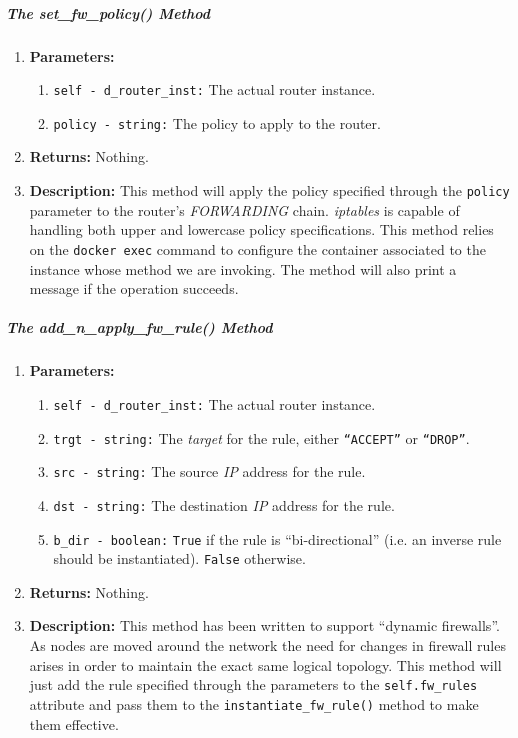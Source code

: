         \subparagraph{The set\_fw\_policy() Method}
            \begin{enumerate}
                \item \textbf{Parameters:}
                \begin{enumerate}
                    \item \texttt{self - d\_router\_inst:} The actual router instance.
                    \item \texttt{policy - string:} The policy to apply to the router.
                \end{enumerate}
                \item \textbf{Returns:} Nothing.
                \item \textbf{Description:} This method will apply the policy specified through the \texttt{policy} parameter to the router's \textit{FORWARDING} chain. \textit{iptables} is capable of handling both upper and lowercase policy specifications. This method relies on the \texttt{docker exec} command to configure the container associated to the instance whose method we are invoking. The method will also print a message if the operation succeeds.
            \end{enumerate}

        \subparagraph{The add\_n\_apply\_fw\_rule() Method}
            \begin{enumerate}
                \item \textbf{Parameters:}
                \begin{enumerate}
                    \item \texttt{self - d\_router\_inst:} The actual router instance.
                    \item \texttt{trgt - string:} The \textit{target} for the rule, either \texttt{``ACCEPT''} or \texttt{``DROP''}.
                    \item \texttt{src - string:} The source \textit{IP} address for the rule.
                    \item \texttt{dst - string:} The destination \textit{IP} address for the rule.
                    \item \texttt{b\_dir - boolean:} \texttt{True} if the rule is ``bi-directional'' (i.e. an inverse rule should be instantiated). \texttt{False} otherwise.
                \end{enumerate}
                \item \textbf{Returns:} Nothing.
                \item \textbf{Description:} This method has been written to support ``dynamic firewalls''. As nodes are moved around the network the need for changes in firewall rules arises in order to maintain the exact same logical topology. This method will just add the rule specified through the parameters to the \texttt{self.fw\_rules} attribute and pass them to the \texttt{instantiate\_fw\_rule()} method to make them effective.
            \end{enumerate}

